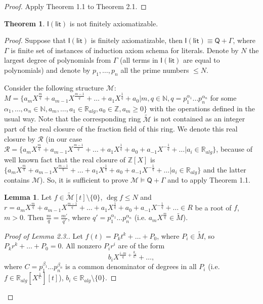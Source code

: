 \documentclass[a4paper,14pt]{article}
\theoremstyle{definition}
\theoremstyle{theorem}
\newtheorem{theorem}{Theorem}[section]
\theoremstyle{lemma}
\newtheorem{lemma}{Lemma}[section]
\theoremstyle{proposition}
\theoremstyle{remark}
\theoremstyle{corollary}
\theoremstyle{problem}
\theoremstyle{hypothesis}
\begin{document}
\begin{proof}
    Apply Theorem 1.1 to Theorem 2.1.
\end{proof}


\begin{theorem}
    $\mathsf{I(lit)}$ is not finitely axiomatizable.
\end{theorem}

\begin{proof}
    Suppose that $\mathsf{I(lit)}$ is finitely axiomatizable, then $\mathsf{I(lit)} \equiv \mathsf Q + \Gamma$, where $\Gamma$ is finite set of instances of induction axiom schema for literals. Denote by $N$ the largest degree of polynomials from $\Gamma$ (all terms in $\mathsf{I(lit)}$ are equal to polynomials) and denote by $p_1, \dots, p_n$ all the prime numbers $\leqslant N$. 
    
    Consider the following structure $\mathcal{M}$: $M = \{a_m X^{\frac{m}{q}} + a_{m - 1} X^{\frac{m - 1}{q}} + \dots + a_1 X^{\frac{1}{q}} + a_0| m, q \in \mathbb N, q = p_1^{\alpha_1}\dots p_n^{\alpha_n}$ for some $\alpha_1, \dots, \alpha_n \in \mathbb N, a_m, \dots, a_1 \in \mathbb R_{alg}, a_0 \in \mathbb Z, a_m \geqslant 0\}$ with the operations defined in the usual way. Note that the corresponding ring $\widetilde{\mathcal M}$ is not contained as an integer part of the real closure of the fraction field of this ring. We denote this real closure by $\mathcal R$ (in our case $\mathcal R = \{a_m X^{\frac{m}{q}} + a_{m - 1} X^{\frac{m - 1}{q}} + \dots + a_1 X^{\frac{1}{q}} + a_0 + a_{-1}X^{-\frac{1}{q}} + \dots | a_i \in \mathbb R_{alg}\}$, because of well known fact that the real closure of $\mathbb Z[X]$ is $\{a_m X^{\frac{m}{q}} + a_{m - 1} X^{\frac{m - 1}{q}} + \dots + a_1 X^{\frac{1}{q}} + a_0 + a_{-1}X^{-\frac{1}{q}} + \dots | a_i \in \mathbb R_{alg}\}$ and the latter contains $\mathcal M$). So, it is sufficient to prove $\mathcal M \vDash \mathsf Q + \Gamma$ and to apply Theorem 1.1. 
    
    \begin{lemma}
        Let $f \in \widetilde{\mathcal M}[t]\setminus\{0\}$, $\deg f \leqslant N$ and $r = a_m X^{\frac{m}{q}} + a_{m - 1} X^{\frac{m - 1}{q}} + \dots + a_1 X^{\frac{1}{q}} + a_0 + a_{-1} X^{-\frac{1}{q}} + \dots \in R$ be a root of $f$, $m > 0$. Then $\frac{m}{q} = \frac{m'}{q'}$, where $q' = p_1^{\alpha_1} \dots p_n^{\alpha_n}$ (i.e. $a_m X^{\frac{m}{q}} \in \widetilde{M}$). 
    \end{lemma}
    
    \begin{proof}[Proof of Lemma 2.3.]
        Let $f(t) = P_k t^k + \dots + P_0$, where $P_i \in \widetilde{M}$, so $P_k r^k + \dots + P_0 = 0$. All nonzero $P_i r^i$ are of the form 
        $$b_i X^{\frac{i\cdot m}{q} + \frac{k_i}{C}} + \dots,$$ 
        where $C = p_1^{\beta_1}\dots p_n^{\beta_n}$ is a common denominator of degrees in all $P_i$ (i.e. $f \in \mathbb R_{alg} [X^{\frac{1}{C}}][t]$), $b_i \in \mathbb R_{alg}\setminus\{0\}$.
        

\end{proof}
\end{proof}
\end{document}
